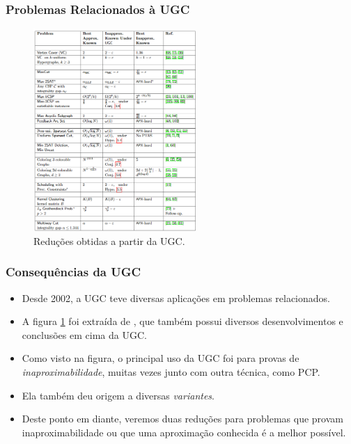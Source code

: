 \documentclass[11pt, handout]{beamer}
\begin{document}
\begin{frame}
    \frametitle{Problemas Relacionados à UGC}
    \begin{figure}
        \centering
        \includegraphics[width=0.55\textwidth]{images/reducoes.png}
        \caption{Reduções obtidas a partir da UGC.}
        \label{fig:reducoes}
    \end{figure}
\end{frame}{}

\begin{frame}[<+->]
    \frametitle{Consequências da UGC}
    \begin{itemize}
        \item Desde 2002, a UGC teve diversas aplicações em problemas relacionados.
        \item A figura \ref{fig:reducoes} foi extraída de \cite{survey}, que também possui diversos desenvolvimentos e conclusões em cima da UGC.
        \item Como visto na figura, o principal uso da UGC foi para provas de \emph{inaproximabilidade}, muitas vezes junto com outra técnica, como PCP.
        \item Ela também deu origem a diversas \emph{variantes}.
        \item Deste ponto em diante, veremos duas reduções para problemas que provam inaproximabilidade ou que uma aproximação conhecida é a melhor possível.
    \end{itemize}
\end{frame}{}
\end{document}

